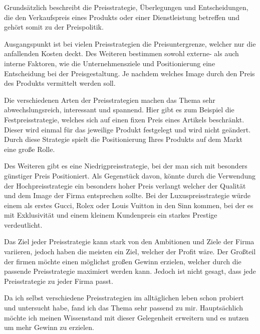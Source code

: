 
\begin{refsection}
  
Grundsätzlich beschreibt die Preisstrategie, Überlegungen und Entscheidungen, die den Verkaufspreis eines Produkts oder einer Dienstleistung betreffen und gehört somit zu der Preispolitik.

Ausgangspunkt ist bei vielen Preisstrategien die Preisuntergrenze, welcher nur die anfallenden Kosten deckt. Des Weiteren bestimmen sowohl externe- als auch interne Faktoren, wie die Unternehmensziele und Positionierung eine Entscheidung bei der Preisgestaltung. Je nachdem welches Image durch den Preis des Produkts vermittelt werden soll.

Die verschiedenen Arten der Preisstrategien machen das Thema sehr abwechslungsreich, interessant und spannend. Hier gibt es zum Beispiel die Festpreisstrategie, welches sich auf einen fixen Preis eines Artikels beschränkt. Dieser wird einmal für das jeweilige Produkt festgelegt und wird nicht geändert. Durch diese Strategie spielt die Positionierung Ihres Produkts auf dem Markt eine gro\ss{}e Rolle.

Des Weiteren gibt es eine Niedrigpreisstrategie, bei der man sich mit besonders günstiger Preis Positioniert. Als Gegenstück davon, könnte durch die Verwendung der Hochpreisstrategie ein besonders hoher Preis verlangt welcher der Qualität und dem Image der Firma entsprechen sollte. Bei der Luxuspreisstrategie würde einem als erstes Gucci, Rolex oder Louis Vuitton in den Sinn kommen, bei der es mit Exklusivität und einem kleinem Kundenpreis ein starkes Prestige verdeutlicht.

Das Ziel jeder Preisstrategie kann stark von den Ambitionen und Ziele der Firma variieren, jedoch haben die meisten ein Ziel, welcher der Profit wäre. Der Gro\ss{}teil der firmen möchte einen möglichst gro\ss{}en Gewinn erzielen, welcher durch die passende Preisstrategie maximiert werden kann. Jedoch ist nicht gesagt, dass jede Preisstrategie zu jeder Firma passt.

Da ich selbst verschiedene Preisstrategien im alltäglichen leben schon probiert und untersucht habe, fand ich das Thema sehr passend zu mir. Hauptsächlich möchte ich meinen Wissenstand mit dieser Gelegenheit erweitern und es nutzen um mehr Gewinn zu erzielen.
  \clearpage
  \printbibliography[heading=subsubbibliography]
\end{refsection}
\clearpage
